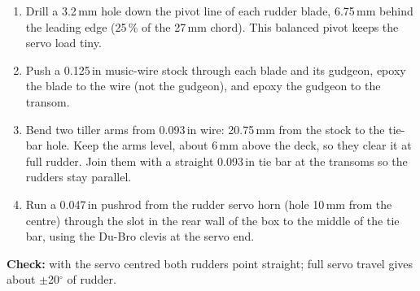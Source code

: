 \documentclass[11pt]{article}
\newcommand{\chk}[1]{\par\noindent\textbf{Check:} #1\par}
\begin{document}
\begin{enumerate}
\item Drill a 3.2\,mm hole down the pivot line of each rudder blade, 6.75\,mm behind the leading edge (25\,\% of the 27\,mm chord). This balanced pivot keeps the servo load tiny.
\item Push a 0.125\,in music-wire stock through each blade and its gudgeon, epoxy the blade to the wire (not the gudgeon), and epoxy the gudgeon to the transom.
\item Bend two tiller arms from 0.093\,in wire: 20.75\,mm from the stock to the tie-bar hole. Keep the arms level, about 6\,mm above the deck, so they clear it at full rudder. Join them with a straight 0.093\,in tie bar at the transoms so the rudders stay parallel.
\item Run a 0.047\,in pushrod from the rudder servo horn (hole 10\,mm from the centre) through the slot in the rear wall of the box to the middle of the tie bar, using the Du-Bro clevis at the servo end.
\end{enumerate}
\chk{with the servo centred both rudders point straight; full servo travel gives about $\pm$20$^\circ$ of rudder.}
\end{document}

